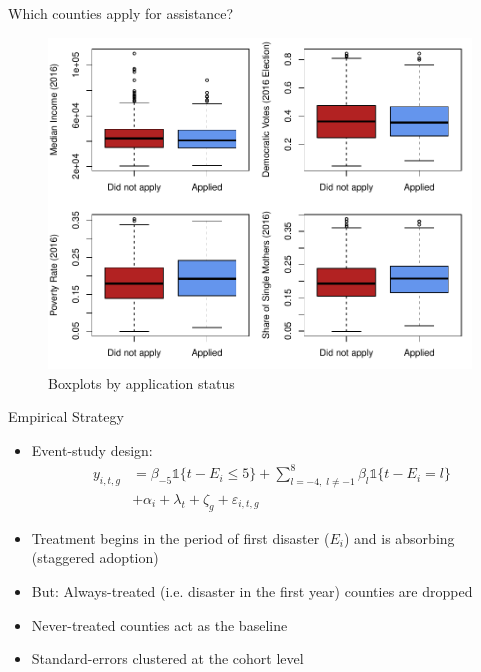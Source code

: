 \documentclass[hyperref={colorlinks = true,linkcolor = blue, citecolor=blue,urlcolor=blue}]{beamer}
\begin{document}
\begin{frame}{Which counties apply for assistance?}
	\begin{figure}[!h]
		\centering
		\includegraphics[scale=0.58]{"../Code & Data/AssistanceCovBoxplot.pdf"}
		\caption{Boxplots by application status}
		\label{AssistCovBoxplot}
	\end{figure}
\end{frame}

\begin{frame}{Empirical Strategy}
	\begin{itemize}
		\item Event-study design:
		\begin{align*}
			y_{i, t, g} &= \beta_{-5}  \mathds{1}\{t - E_i \leq 5\} + \sum_{l = -4, \; l \neq -1}^{8} \beta_l \mathds{1}\{t - E_i = l\} \\ &+ \alpha_i + \lambda_t + \zeta_g + \varepsilon_{i, t, g}
		\end{align*}
		\item Treatment begins in the period of first disaster ($E_i$) and is absorbing (staggered adoption)
		\item But: Always-treated (i.e. disaster in the first year) counties are dropped
		\item Never-treated counties act as the baseline
		\item Standard-errors clustered at the cohort level \citep{Abadie_2017}
	\end{itemize}
\end{frame}
\end{document}
